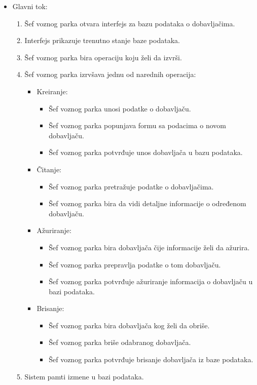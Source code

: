\begin{itemize}
	\item Glavni tok:
		\begin{enumerate}
		    \item Šef voznog parka otvara interfejs za bazu podataka o dobavljačima.
		    \item Interfejs prikazuje trenutno stanje baze podataka.
		    \item Šef voznog parka bira operaciju koju želi da izvrši.
			\item Šef voznog parka izrvšava jednu od narednih operacija:
			\begin{itemize}
                \item Kreiranje:
                \begin{itemize}
                    \item Šef voznog parka unosi podatke o dobavljaču.
                    \item Šef voznog parka popunjava formu sa podacima o novom dobavljaču.
                    \item Šef voznog parka potvrđuje unos dobavljača u bazu podataka.
                \end{itemize}
                \item Čitanje:
                \begin{itemize}
                    \item Šef voznog parka pretražuje podatke o dobavljačima.
                    \item Šef voznog parka bira da vidi detaljne informacije o određenom dobavljaču.
                \end{itemize}
                \item Ažuriranje:
                \begin{itemize}
                    \item Šef voznog parka bira dobavljača čije informacije želi da ažurira.
                    \item Šef voznog parka prepravlja podatke o tom dobavljaču.
                    \item Šef voznog parka potvrđuje ažuriranje informacija o dobavljaču u bazi podataka.
                \end{itemize}
                \item Brisanje:
                \begin{itemize}
                    \item Šef voznog parka bira dobavljača kog želi da obriše.
                    \item Šef voznog parka briše odabranog dobavljača.
                    \item Šef voznog parka potvrđuje brisanje dobavljača iz baze podataka.
                \end{itemize}
            \end{itemize}
		\item Sistem pamti izmene u bazi podataka.
		\end{enumerate}


\end{itemize}
